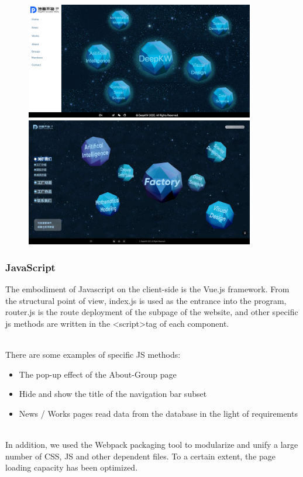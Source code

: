 \documentclass{article}
\begin{document}
\begin{figure}[h]
    \centering
    \includegraphics[width=10cm]{img/exp/css.png}
    \includegraphics[width=10cm]{img/05.jpg}
    \caption{}
    \label{}
\end{figure}

\subsubsection{JavaScript}
The embodiment of Javascript on the client-side is the Vue.js framework. 
From the structural point of view, index.js is used as the entrance 
into the program, router.js is the route deployment of the subpage 
of the website, and other specific js methods are written in 
the \textless script\textgreater\space tag of each component.

~\\
\noindent
There are some examples of specific JS methods:
\begin{itemize}
    \item The pop-up effect of the About-Group page
    \item Hide and show the title of the navigation bar subset
    \item News / Works pages read data from the database in the light of requirements
\end{itemize}

~\\
\noindent
In addition, we used the Webpack packaging tool to modularize and 
unify a large number of CSS, JS and other dependent files. To a certain 
extent, the page loading capacity has been optimized.
\end{document}
